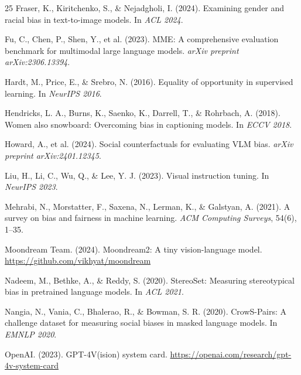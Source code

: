 \documentclass{article}
\begin{document}
\begin{thebibliography}{25}
Fraser, K., Kiritchenko, S., \& Nejadgholi, I. (2024).
\newblock Examining gender and racial bias in text-to-image models.
\newblock In \textit{ACL 2024}.

Fu, C., Chen, P., Shen, Y., et al. (2023).
\newblock MME: A comprehensive evaluation benchmark for multimodal large language models.
\newblock \textit{arXiv preprint arXiv:2306.13394}.

Hardt, M., Price, E., \& Srebro, N. (2016).
\newblock Equality of opportunity in supervised learning.
\newblock In \textit{NeurIPS 2016}.

Hendricks, L. A., Burns, K., Saenko, K., Darrell, T., \& Rohrbach, A. (2018).
\newblock Women also snowboard: Overcoming bias in captioning models.
\newblock In \textit{ECCV 2018}.

Howard, A., et al. (2024).
\newblock Social counterfactuals for evaluating VLM bias.
\newblock \textit{arXiv preprint arXiv:2401.12345}.

Liu, H., Li, C., Wu, Q., \& Lee, Y. J. (2023).
\newblock Visual instruction tuning.
\newblock In \textit{NeurIPS 2023}.

Mehrabi, N., Morstatter, F., Saxena, N., Lerman, K., \& Galstyan, A. (2021).
\newblock A survey on bias and fairness in machine learning.
\newblock \textit{ACM Computing Surveys}, 54(6), 1--35.

Moondream Team. (2024).
\newblock Moondream2: A tiny vision-language model.
\newblock \url{https://github.com/vikhyat/moondream}

Nadeem, M., Bethke, A., \& Reddy, S. (2020).
\newblock StereoSet: Measuring stereotypical bias in pretrained language models.
\newblock In \textit{ACL 2021}.

Nangia, N., Vania, C., Bhalerao, R., \& Bowman, S. R. (2020).
\newblock CrowS-Pairs: A challenge dataset for measuring social biases in masked language models.
\newblock In \textit{EMNLP 2020}.

OpenAI. (2023).
\newblock GPT-4V(ision) system card.
\newblock \url{https://openai.com/research/gpt-4v-system-card}


\end{thebibliography}
\end{document}

